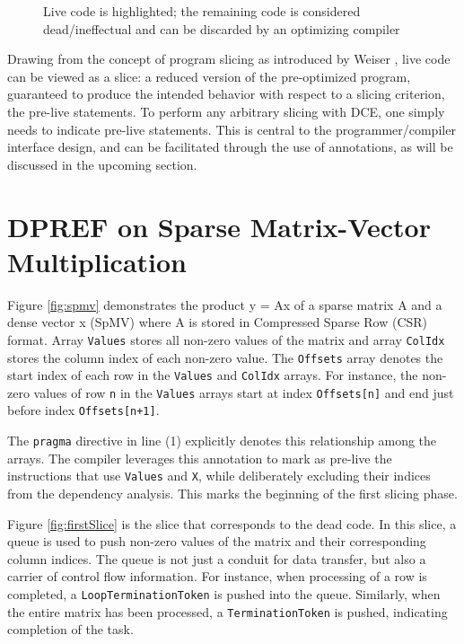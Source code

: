 \documentclass{acaces}
\begin{document}
\begin{figure}[ht]
  \centering
  
  \caption{Live code is highlighted; the remaining code is considered dead/ineffectual and can be discarded by an optimizing compiler}
  \label{fig:dce}
\end{figure}

Drawing from the concept of program slicing as introduced by Weiser \cite{Weiser1984}, live code can be viewed as a slice:
a reduced version of the pre-optimized program, guaranteed to produce the intended behavior with respect to a slicing criterion, the pre-live statements.
To perform any arbitrary slicing with DCE, one simply needs to indicate pre-live statements.
This is central to the programmer/compiler interface design,
and can be facilitated through the use of annotations,
as will be discussed in the upcoming section.

\section{DPREF on Sparse Matrix-Vector Multiplication}

Figure \ref{fig:spmv} demonstrates the product y = Ax of a sparse matrix A and a dense vector x (SpMV) where A is stored in Compressed Sparse Row (CSR) format.
Array \texttt{Values} stores all non-zero values of the matrix and array \texttt{ColIdx} stores the column index of each non-zero value.
The \texttt{Offsets} array denotes the start index of each row in the \texttt{Values} and \texttt{ColIdx} arrays.
For instance, the non-zero values of row \texttt{n} in the \texttt{Values} arrays start at index \texttt{Offsets[n]}
and end just before index \texttt{Offsets[n+1]}.

The \texttt{pragma} directive in line (1) explicitly denotes this relationship among the arrays.
The compiler leverages this annotation to mark as pre-live the instructions that use \texttt{Values} and \texttt{X},
while deliberately excluding their indices from the dependency analysis.
This marks the beginning of the first slicing phase.

Figure \ref{fig:firstSlice} is the slice that corresponds to the dead code.
In this slice, a queue is used to push non-zero values of the matrix and their corresponding column indices.
The queue is not just a conduit for data transfer, but also a carrier of control flow information.
For instance, when processing of a row is completed, a \texttt{LoopTerminationToken} is pushed into the queue.
Similarly, when the entire matrix has been processed, a \texttt{TerminationToken} is pushed, indicating completion of the task.
\end{document}
